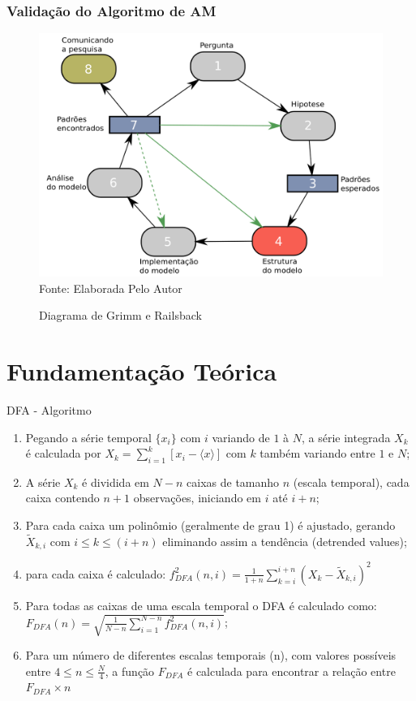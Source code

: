 \documentclass[10pt]{beamer}
\begin{document}
\begin{frame}
  \frametitle{Validação do Algoritmo de AM}

  \begin{figure}[!htb]
    \centering
    \caption{Diagrama de Grimm e Railsback}
    \includegraphics[width=.7\textwidth]{../Figures/intro/Ciclo_Grimm.png}
    \\{\footnotesize Fonte: Elaborada Pelo Autor}
    \label{fig:fluxoGrimm}
  \end{figure}

  

\end{frame}


\section{Fundamentação Teórica}


\begin{frame}{DFA - Algoritmo}


  \begin{enumerate}
    \label{list:dfa}
    \item Pegando a série temporal \(\{x_{i}\}\) com  \(i\) variando de  \(1\) à \(N\), a série integrada \(X_{k}\) é calculada por \(X_{k} = \sum_{i=1}^{k}\left[x_{i} - \langle x \rangle \right] \) com \(k\) também variando entre \(1\) e \(N\);
    \item A série  \(X_{k}\) é dividida em \(N - n\) caixas de tamanho \(n\) (escala temporal), cada caixa contendo \(n + 1\) observações, iniciando em \(i\) até \(i + n\);
    \item Para cada caixa um polinômio (geralmente de grau 1) é ajustado, gerando \(\widetilde{X}_{k, i}\) com \( i \le k \le (i + n) \) eliminando assim a tendência (detrended values);
    \item  para cada caixa é calculado: \(f_{DFA}^{2}(n, i) = \frac{1}{1+n} \sum_{k=i}^{i + n}(X_{k}-\widetilde{X}_{k, i})^{2}\)
    \item Para todas as caixas de uma escala temporal o DFA é calculado como: \(F_{DFA}(n) = \sqrt{\frac{1}{N - n} \sum_{i=1}^{N-n} f_{DFA}^{2}(n, i)}\);
    \item Para um número de diferentes escalas temporais (n), com valores possíveis entre \( 4 \le n \le \frac{N}{4}\), a função \(F_{DFA}\) é calculada para encontrar a relação entre \(F_{DFA} \times n\)
  \end{enumerate}


\end{frame}
\end{document}
